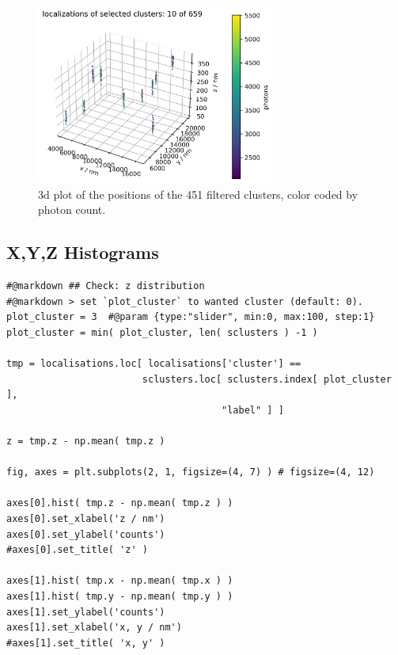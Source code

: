 \documentclass[11pt, a4paper, oneside, twocolumn]{report}
\begin{document}
\begin{figure}[h!]
  \centering
  \includegraphics[width=0.7\textwidth]{8_best_filtered_clusters.png}
  \caption{3d plot of the positions of the 451 filtered clusters,
    color coded by photon count.}
  \label{f:89_best_filtered_clusters}
\end{figure}


\subsection{X,Y,Z Histograms}

\begin{verbatim}
#@markdown ## Check: z distribution
#@markdown > set `plot_cluster` to wanted cluster (default: 0).
plot_cluster = 3  #@param {type:"slider", min:0, max:100, step:1}
plot_cluster = min( plot_cluster, len( sclusters ) -1 )

tmp = localisations.loc[ localisations['cluster'] == 
                        sclusters.loc[ sclusters.index[ plot_cluster ],
                                      "label" ] ]

z = tmp.z - np.mean( tmp.z )

fig, axes = plt.subplots(2, 1, figsize=(4, 7) ) # figsize=(4, 12)

axes[0].hist( tmp.z - np.mean( tmp.z ) )
axes[0].set_xlabel('z / nm')
axes[0].set_ylabel('counts')
#axes[0].set_title( 'z' )

axes[1].hist( tmp.x - np.mean( tmp.x ) )
axes[1].hist( tmp.y - np.mean( tmp.y ) )
axes[1].set_ylabel('counts')
axes[1].set_xlabel('x, y / nm')
#axes[1].set_title( 'x, y' )
\end{verbatim}
\end{document}
